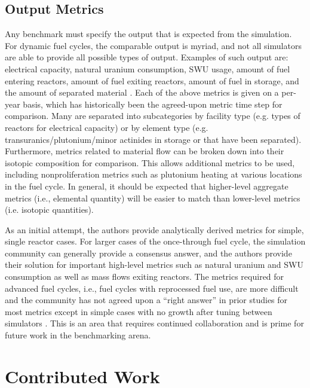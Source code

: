 \documentclass{anstrans}
\begin{document}
\subsection{Output Metrics}
Any benchmark must specify the output that is expected from the simulation. For
dynamic fuel cycles, the comparable output is myriad, and not all simulators are
able to provide all possible types of output. Examples of such output are:
electrical capacity, natural uranium consumption, SWU usage, amount of fuel
entering reactors, amount of fuel exiting reactors, amount of fuel in storage,
and the amount of separated material
\cite{boucher_specification_2008}\cite{guerin_benchmark_2009}. Each of the above
metrics is given on a per-year basis, which has historically been the
agreed-upon metric time step for comparison. Many are separated into
subcategories by facility type (e.g. types of reactors for electrical capacity)
or by element type (e.g. transuranics/plutonium/minor actinides in storage or
that have been separated). Furthermore, metrics related to material flow can be
broken down into their isotopic composition for comparison. This allows
additional metrics to be used, including nonproliferation metrics such as
plutonium heating at various locations in the fuel cycle. In general, it should
be expected that higher-level aggregate metrics (i.e., elemental quantity) will be 
easier to match than lower-level metrics (i.e. isotopic quantities).

As an initial attempt, the authors provide analytically derived metrics for simple,
single reactor cases. For larger cases of the once-through fuel cycle, the
simulation community can generally provide a consensus answer, and the authors
provide their solution for important high-level metrics such as natural uranium
and SWU consumption as well as mass flows exiting reactors. The metrics required
for advanced fuel cycles, i.e., fuel cycles with reprocessed fuel use, are more
difficult and the community has not agreed upon a ``right answer'' in prior
studies for most metrics except in simple cases with no growth after tuning
between simulators \cite{guerin_benchmark_2009}. This is an area that requires
continued collaboration and is prime for future work in the benchmarking arena.

\section{Contributed Work}
\end{document}
